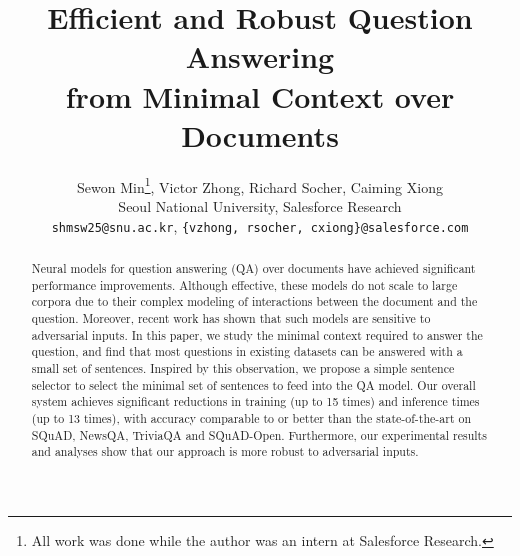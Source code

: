 \documentclass[11pt,a4paper]{article}
\title{
Efficient and Robust Question Answering \\
from Minimal Context over Documents }
\author{
	Sewon Min\thanks{All work was done while the author was an intern at Salesforce Research.}, Victor Zhong, Richard Socher, Caiming Xiong \\
    Seoul National University, Salesforce Research \\
    {\tt shmsw25@snu.ac.kr}, {\tt \{vzhong, rsocher, cxiong\}@salesforce.com}
}
\date{}
\begin{document}
\maketitle




\begin{abstract}
Neural models for question answering (QA) over documents have achieved significant performance improvements. Although effective, these models do not scale to large corpora due to their complex modeling of interactions between the document and the question. Moreover, recent work has shown that such models are sensitive to adversarial inputs. In this paper, we study the minimal context required to answer the question, and find that most questions in existing datasets can be answered with a small set of sentences. Inspired by this observation, we propose a simple sentence selector to select the minimal set of sentences to feed into the QA model. Our overall system achieves significant reductions in training (up to 15 times) and inference times (up to 13 times), with accuracy comparable to or better than the state-of-the-art on SQuAD, NewsQA, TriviaQA and SQuAD-Open. Furthermore, our experimental results and analyses show that our approach is more robust to adversarial inputs.
\end{abstract}
\end{document}
